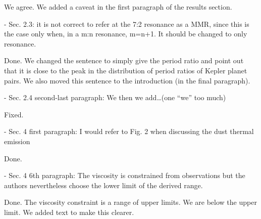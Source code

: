 \documentclass{article}
\begin{document}
{\color{blue}
We agree. We added a caveat in the first paragraph of the results section.
}

- Sec. 2.3: it is not correct to refer at the 7:2 resonance as a MMR, since this
is the case only when, in a m:n resonance, m=n+1. It should be changed to only
resonance.

{\color{blue}
Done. We changed the sentence to simply give the period ratio and point out that
it is close to the peak in the distribution of period ratios of Kepler planet
pairs. We also moved this sentence to the introduction (in the final paragraph).
}

- Sec. 2.4 second-last paragraph: We then we add\ldots (one ``we'' too much)

{\color{blue}
Fixed.
}

- Sec. 4 first paragraph: I would refer to Fig. 2 when discussing the dust
thermal emission

{\color{blue}
Done.
}

- Sec. 4 6th paragraph: The viscosity is constrained from observations but the
authors nevertheless choose the lower limit of the derived range.

{\color{blue}
   Done. The viscosity constraint is a range of upper limits. We are
below the upper limit. We added text to make this clearer.
}
\end{document}
